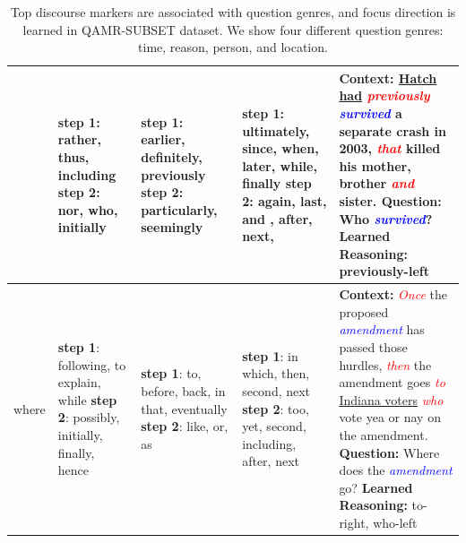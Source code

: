 \begin{table}[t]
{\begin{tabular}{|p{1.8cm}|p{2.5cm}|p{2.5cm}|p{2.5cm}|p{5.8cm}|}
	& \textbf{step 1}: rather, thus, including \newline\newline\textbf{step 2}: nor, who, initially &\textbf{step 1}: earlier, definitely, previously \newline\newline\textbf{step 2}: particularly, seemingly
		&\textbf{step 1}: ultimately, since, when, later, while, finally \newline \textbf{step 2}:  again, last, and , after, next, 
	& \textbf{Context: }\underline{Hatch had} \textit{\textcolor{red}{previously}} \textit{\textcolor{blue}{survived}} a separate crash in 2003, \textit{\textcolor{red}{that}} killed his mother, brother \textit{\textcolor{red}{and}} sister.
  \newline \textbf{Question: }Who \textit{\textcolor{blue}{survived}}?\newline \textbf{Learned Reasoning: }previously-left\\ 
	\hline
  where 
 
  
	 &\textbf{step 1}: following, to explain, while \newline\newline\textbf{step 2}: possibly, initially, finally, hence &\textbf{step 1}: to, before, back, in that, eventually \newline\textbf{step 2}: like, or, as & \textbf{step 1}: in which, then, second, next \newline\newline \textbf{step 2}: too, yet, second, including, after, next
  & \textbf{Context: }\textit{\textcolor{red}{Once}} the proposed \textit{\textcolor{blue}{amendment}} has passed those hurdles, \textit{\textcolor{red}{then}} the amendment goes \textit{\textcolor{red}{to}} \underline{Indiana voters} \textit{\textcolor{red}{who}} vote yea or nay on the amendment. 
  \newline \textbf{Question: }Where does the \textit{\textcolor{blue}{amendment}} go?
  \newline \textbf{Learned Reasoning: }to-right, who-left\\ 
 \hline
\end{tabular}
}
\caption{\fontsize{9}{12}\selectfont Top discourse markers are associated with question genres, and focus direction is learned in \textsc{QAMR-SUBSET} dataset. We show four different question genres: time, reason, person, and location.}
\label{tab:disc_phrase}
\vspace{-3ex}
\end{table}

